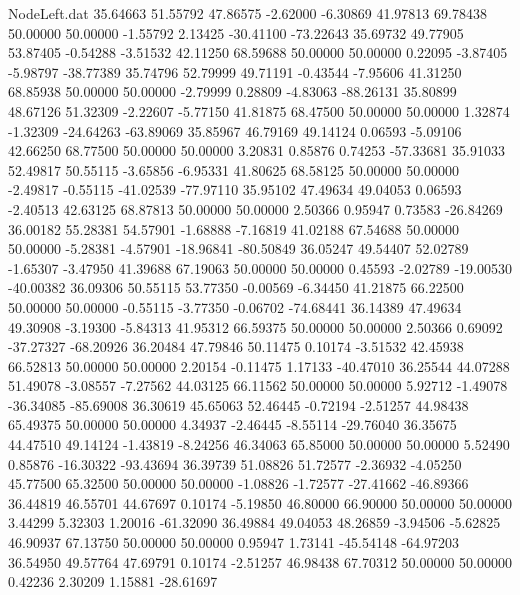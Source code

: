 \begin{filecontents}{NodeLeft.dat}
  35.64663   51.55792   47.86575    -2.62000   -6.30869   41.97813   69.78438   50.00000   50.00000   -1.55792    2.13425  -30.41100  -73.22643
  35.69732   49.77905   53.87405    -0.54288   -3.51532   42.11250   68.59688   50.00000   50.00000    0.22095   -3.87405   -5.98797  -38.77389
  35.74796   52.79999   49.71191    -0.43544   -7.95606   41.31250   68.85938   50.00000   50.00000   -2.79999    0.28809   -4.83063  -88.26131
  35.80899   48.67126   51.32309    -2.22607   -5.77150   41.81875   68.47500   50.00000   50.00000    1.32874   -1.32309  -24.64263  -63.89069
  35.85967   46.79169   49.14124     0.06593   -5.09106   42.66250   68.77500   50.00000   50.00000    3.20831    0.85876    0.74253  -57.33681
  35.91033   52.49817   50.55115    -3.65856   -6.95331   41.80625   68.58125   50.00000   50.00000   -2.49817   -0.55115  -41.02539  -77.97110
  35.95102   47.49634   49.04053     0.06593   -2.40513   42.63125   68.87813   50.00000   50.00000    2.50366    0.95947    0.73583  -26.84269
  36.00182   55.28381   54.57901    -1.68888   -7.16819   41.02188   67.54688   50.00000   50.00000   -5.28381   -4.57901  -18.96841  -80.50849
  36.05247   49.54407   52.02789    -1.65307   -3.47950   41.39688   67.19063   50.00000   50.00000    0.45593   -2.02789  -19.00530  -40.00382
  36.09306   50.55115   53.77350    -0.00569   -6.34450   41.21875   66.22500   50.00000   50.00000   -0.55115   -3.77350   -0.06702  -74.68441
  36.14389   47.49634   49.30908    -3.19300   -5.84313   41.95312   66.59375   50.00000   50.00000    2.50366    0.69092  -37.27327  -68.20926
  36.20484   47.79846   50.11475     0.10174   -3.51532   42.45938   66.52813   50.00000   50.00000    2.20154   -0.11475    1.17133  -40.47010
  36.25544   44.07288   51.49078    -3.08557   -7.27562   44.03125   66.11562   50.00000   50.00000    5.92712   -1.49078  -36.34085  -85.69008
  36.30619   45.65063   52.46445    -0.72194   -2.51257   44.98438   65.49375   50.00000   50.00000    4.34937   -2.46445   -8.55114  -29.76040
  36.35675   44.47510   49.14124    -1.43819   -8.24256   46.34063   65.85000   50.00000   50.00000    5.52490    0.85876  -16.30322  -93.43694
  36.39739   51.08826   51.72577    -2.36932   -4.05250   45.77500   65.32500   50.00000   50.00000   -1.08826   -1.72577  -27.41662  -46.89366
  36.44819   46.55701   44.67697     0.10174   -5.19850   46.80000   66.90000   50.00000   50.00000    3.44299    5.32303    1.20016  -61.32090
  36.49884   49.04053   48.26859    -3.94506   -5.62825   46.90937   67.13750   50.00000   50.00000    0.95947    1.73141  -45.54148  -64.97203
  36.54950   49.57764   47.69791     0.10174   -2.51257   46.98438   67.70312   50.00000   50.00000    0.42236    2.30209    1.15881  -28.61697

\end{filecontents}
